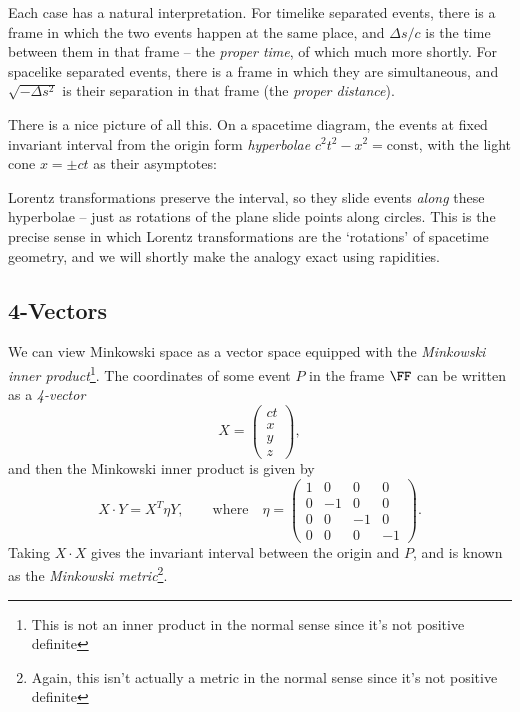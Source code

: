 \documentclass[a4paper]{scrartcl}
\begin{document}
Each case has a natural interpretation. For timelike separated events, there is a frame in which the two events happen at the same place, and $\Delta s/c$ is the time between them in that frame -- the \emph{proper time}, of which much more shortly. For spacelike separated events, there is a frame in which they are simultaneous, and $\sqrt{-\Delta s^2}$ is their separation in that frame (the \emph{proper distance}).

There is a nice picture of all this. On a spacetime diagram, the events at fixed invariant interval from the origin form \emph{hyperbolae} $c^2t^2 - x^2 = \text{const}$, with the light cone $x = \pm ct$ as their asymptotes:
\begin{center}
\end{center}
Lorentz transformations preserve the interval, so they slide events \emph{along} these hyperbolae -- just as rotations of the plane slide points along circles. This is the precise sense in which Lorentz transformations are the `rotations' of spacetime geometry, and we will shortly make the analogy exact using rapidities.

\subsection{4-Vectors}

We can view Minkowski space as a vector space equipped with the \emph{Minkowski inner product}\footnote{This is not an inner product in the normal sense since it's not positive definite}. The coordinates of some event $P$ in the frame $\FF$ can be written as a \emph{4-vector}
$$	
X= \begin{pmatrix}
	ct \\ x \\ y \\ z
\end{pmatrix},
$$
and then the Minkowski inner product is given by
$$
X \cdot Y = X^T \eta Y, \quad \quad \text{where} \quad \eta = \begin{pmatrix}
	1 & 0 & 0 & 0 \\
	0 & -1 & 0 & 0 \\
	0 & 0 & -1 & 0 \\
	0 & 0 & 0 & -1
\end{pmatrix}.
$$
Taking $X \cdot X$ gives the invariant interval between the origin and $P$, and is known as the \emph{Minkowski metric}\footnote{Again, this isn't actually a metric in the normal sense since it's not positive definite}.
\end{document}
